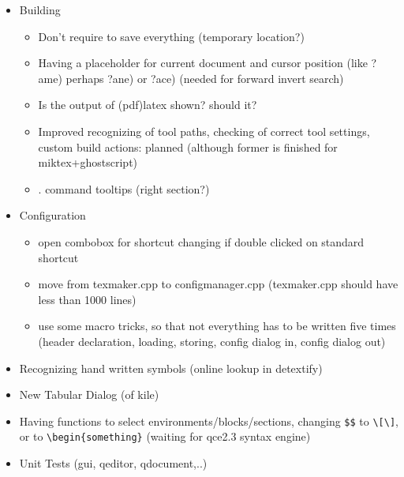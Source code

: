 \documentclass[10pt,a4paper,landscape]{report}
\begin{document}
\begin{itemize}
\begin{itemize}
	\end{itemize}
	\item Building \begin{itemize}
		\item Don't require to save everything (temporary location?)
		\item Having a placeholder for current document and cursor position (like ?ame) perhaps ?ane) or ?ace) (needed for forward invert search)
		\item Is the output of (pdf)latex shown? should it?
		\item Improved recognizing of tool paths, checking of correct tool settings,  custom build actions: planned (although former is finished for miktex+ghostscript)
		\item . command tooltips (right section?)
		
	\end{itemize}
	\item Configuration \begin{itemize}
		\item open combobox for shortcut changing if double clicked on standard shortcut
		\item move from texmaker.cpp to configmanager.cpp (texmaker.cpp should have less than 1000 lines)
		\item use some macro tricks, so that not everything has to be written five times (header declaration, loading, storing, config dialog in, config dialog out)
	\end{itemize} 
	\item Recognizing hand written symbols (online lookup in detextify)
	\item New Tabular Dialog (of kile)
	\item Having functions to select environments/blocks/sections, changing \verb+$$+ to \verb+\[\]+, or to \verb+\begin{something}+ (waiting for qce2.3 syntax engine)
	\item Unit Tests (gui, qeditor, qdocument,..)
\end{itemize}
\end{document}
